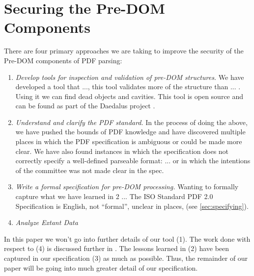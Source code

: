 \section{Securing the Pre-DOM Components }
\label{sec:securing}

There are four primary approaches we are taking to improve the security of the
Pre-DOM components of PDF parsing:
\begin{enumerate}
\item
  \emph{Develop tools for inspection and validation of pre-DOM structures.}
  We have developed a tool that ..., this tool validates more of the structure
  than ... .  Using it we can find dead objects and cavities.
  This tool is open source and can be found as part of the Daedalus
  project \cite{daedalus-url}.
 
\item
  \emph{Understand and clarify the PDF standard.}
  In the process of doing the above, we have pushed the bounds
  of PDF knowledge and have discovered multiple places in which
  the PDF specification is ambiguous or could be made more clear.
  We have also found instances in which the specification
  does not correctly specify a well-defined parseable format:
  ... or in which the intentions of the committee was not made clear in
  the spec.
  
\item
  \emph{Write a formal specification for pre-DOM processing.}
  Wanting to formally capture what we have learned in 2 ...
  The ISO Standard PDF 2.0 Specification \cite{isotc171sc2wg8ISO32000220202020}
  is English, not ``formal'',
  unclear in places, 
  (see \cref{sec:specifying}).
  
\item
  \emph{Analyze Extant Data}
  
\end{enumerate}

In this paper we won't go into further details of our tool (1).
The work done with respect to (4) is discussed further
in \cite{icarus1,icarus2}.
The lessons learned in (2)
have been captured in our specification (3) as much as possible.
Thus, the remainder of our paper will be going into much greater detail of
our specification.